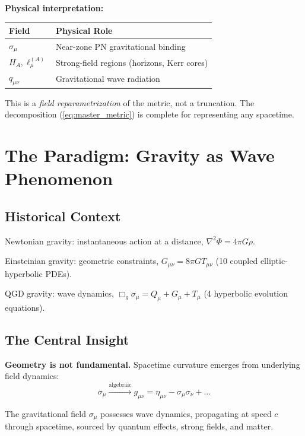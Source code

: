 \documentclass[11pt,a4paper]{article}
\theoremstyle{definition}
\theoremstyle{remark}
\begin{document}
		\textbf{Physical interpretation:}
		\begin{center}
			\begin{tabular}{ll}
				\hline
				\textbf{Field} & \textbf{Physical Role}\\
				\hline
				$\sigma_\mu$ & Near-zone PN gravitational binding\\
				$H_A, \ell_\mu^{(A)}$ & Strong-field regions (horizons, Kerr cores)\\
				$q_{\mu\nu}$ & Gravitational wave radiation\\
				\hline
			\end{tabular}
		\end{center}
		
		This is a \emph{field reparametrization} of the metric, not a truncation. The decomposition (\ref{eq:master_metric}) is complete for representing any spacetime.
		
		\section{The Paradigm: Gravity as Wave Phenomenon}
		
		\subsection{Historical Context}
		
		Newtonian gravity: instantaneous action at a distance, $\nabla^2\Phi = 4\pi G\rho$.
		
		Einsteinian gravity: geometric constraints, $G_{\mu\nu} = 8\pi GT_{\mu\nu}$ (10 coupled elliptic-hyperbolic PDEs).
		
		QGD gravity: wave dynamics, $\Box_g\sigma_\mu = Q_\mu + G_\mu + T_\mu$ (4 hyperbolic evolution equations).
		
		\subsection{The Central Insight}
		
		\textbf{Geometry is not fundamental.} Spacetime curvature emerges from underlying field dynamics:
		\begin{equation}
			\sigma_\mu \xrightarrow{\text{algebraic}} g_{\mu\nu} = \eta_{\mu\nu} - \sigma_\mu\sigma_\nu + ...
		\end{equation}
		
		The gravitational field $\sigma_\mu$ possesses wave dynamics, propagating at speed $c$ through spacetime, sourced by quantum effects, strong fields, and matter.
		
\end{document}
